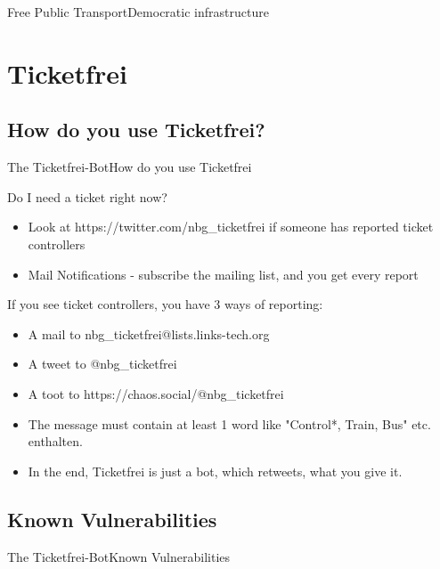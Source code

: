 \documentclass[10pt]{beamer}
\begin{document}
{\begin{frame}{Free Public Transport}{Democratic infrastructure}
\end{frame}


\section{Ticketfrei}
\subsection{How do you use Ticketfrei?}
\begin{frame}{The Ticketfrei-Bot}{How do you use Ticketfrei}

\begin{block}{Do I need a ticket right now?}
  \begin{itemize}
    \item Look at https://twitter.com/nbg\_ticketfrei if someone has reported ticket controllers
    \item Mail Notifications - subscribe the mailing list, and you get every report
  \end{itemize}
\end{block}

\begin{block}{If you see ticket controllers, you have 3 ways of reporting:}
  \begin{itemize}
    \item A mail to nbg\_ticketfrei@lists.links-tech.org
    \item A tweet to @nbg\_ticketfrei
    \item A toot to https://chaos.social/@nbg\_ticketfrei
  \end{itemize}
\end{block}

\begin{itemize}
    \item<2-> The message must contain at least 1 word like "Control*, Train, Bus" etc. enthalten.
    \item<2-> In the end, Ticketfrei is just a bot, which retweets, what you give it.
\end{itemize}

\end{frame}

\subsection{Known Vulnerabilities}
\begin{frame}{The Ticketfrei-Bot}{Known Vulnerabilities}


\end{frame}}
\end{document}

